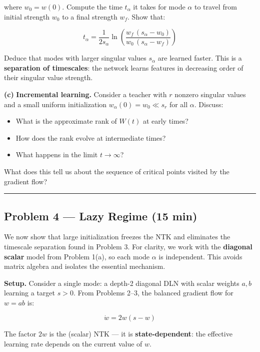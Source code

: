 \documentclass[
]{article}
\providecommand{\tightlist}{%
  \setlength{\itemsep}{0pt}\setlength{\parskip}{0pt}}
\begin{document}
where \(w_0 = w(0)\). Compute the time \(t_\alpha\) it takes for mode
\(\alpha\) to travel from initial strength \(w_0\) to a final strength
\(w_f\). Show that:

\[t_\alpha = \frac{1}{2 s_\alpha} \ln\left(\frac{w_f\,(s_\alpha - w_0)}{w_0\,(s_\alpha - w_f)}\right)\]

Deduce that modes with larger singular values \(s_\alpha\) are learned
faster. This is a \textbf{separation of timescales}: the network learns
features in decreasing order of their singular value strength.

\textbf{(c)} \textbf{Incremental learning.} Consider a teacher with
\(r\) nonzero singular values and a small uniform initialization
\(w_\alpha(0) = w_0 \ll s_r\) for all \(\alpha\). Discuss:

\begin{itemize}
\tightlist
\item
  What is the approximate rank of \(W(t)\) at early times?
\item
  How does the rank evolve at intermediate times?
\item
  What happens in the limit \(t \to \infty\)?
\end{itemize}

What does this tell us about the sequence of critical points visited by
the gradient flow?

\begin{center}\rule{0.5\linewidth}{0.5pt}\end{center}

\subsection{Problem 4 --- Lazy Regime (15
min)}\label{problem-4-lazy-regime-15-min}

We now show that large initialization freezes the NTK and eliminates the
timescale separation found in Problem 3. For clarity, we work with the
\textbf{diagonal scalar} model from Problem 1(a), so each mode
\(\alpha\) is independent. This avoids matrix algebra and isolates the
essential mechanism.

\textbf{Setup.} Consider a single mode: a depth-2 diagonal
DLN with scalar weights \(a, b\) learning a target \(s > 0\). From
Problems 2--3, the balanced gradient flow for \(w = ab\) is:

\[\dot{w} = 2w(s - w)\]

The factor \(2w\) is the (scalar) NTK --- it is
\textbf{state-dependent}: the effective learning rate depends on the
current value of \(w\).
\end{document}
